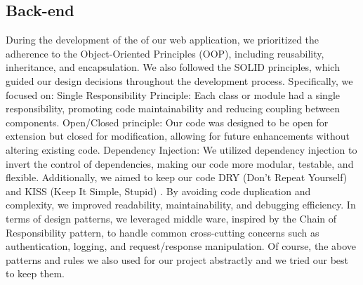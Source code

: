 \subsection{Back-end}\label{back}
\hspace*{1cm} During the development of the  of our web application, we prioritized the adherence to the Object-Oriented Principles (OOP), including reusability, inheritance, and encapsulation. We also followed the SOLID principles, which guided our design decisions throughout the development process. Specifically, we focused on: Single Responsibility Principle: Each class or module had a single responsibility, promoting code maintainability and reducing coupling between components.
Open/Closed principle: Our code was designed to be open for extension but closed for modification, allowing for future enhancements without altering existing code.
Dependency Injection: We utilized dependency injection to invert the control of dependencies, making our code more modular, testable, and flexible.
Additionally, we aimed to keep our code DRY (Don't Repeat Yourself) \cite{dry} and KISS (Keep It Simple, Stupid) \cite{kiss}. By avoiding code duplication and complexity, we improved readability, maintainability, and debugging efficiency. In terms of design patterns, we leveraged middle ware, inspired by the Chain of Responsibility pattern, to handle common cross-cutting concerns such as authentication, logging, and request/response manipulation. Of course, the above patterns and rules we also used for our project abstractly and we tried our best to keep them.

\newpage
